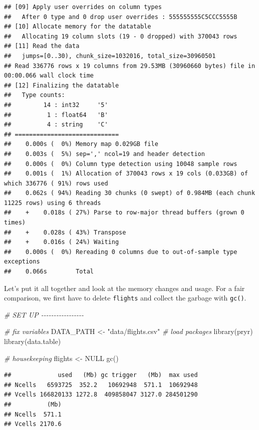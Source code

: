 \documentclass[
  12pt,
]{style/krantz}
\newenvironment{Shaded}{\begin{snugshade}}{\end{snugshade}}
\newcommand{\CommentTok}[1]{\textcolor[rgb]{0.56,0.35,0.01}{\textit{#1}}}
\newcommand{\ConstantTok}[1]{\textcolor[rgb]{0.00,0.00,0.00}{#1}}
\newcommand{\FunctionTok}[1]{\textcolor[rgb]{0.00,0.00,0.00}{#1}}
\newcommand{\NormalTok}[1]{#1}
\newcommand{\OtherTok}[1]{\textcolor[rgb]{0.56,0.35,0.01}{#1}}
\newcommand{\StringTok}[1]{\textcolor[rgb]{0.31,0.60,0.02}{#1}}
\begin{document}
\begin{verbatim}
## [09] Apply user overrides on column types
##   After 0 type and 0 drop user overrides : 555555555C5CCC5555B
## [10] Allocate memory for the datatable
##   Allocating 19 column slots (19 - 0 dropped) with 370043 rows
## [11] Read the data
##   jumps=[0..30), chunk_size=1032016, total_size=30960501
## Read 336776 rows x 19 columns from 29.53MB (30960660 bytes) file in 00:00.066 wall clock time
## [12] Finalizing the datatable
##   Type counts:
##         14 : int32     '5'
##          1 : float64   'B'
##          4 : string    'C'
## =============================
##    0.000s (  0%) Memory map 0.029GB file
##    0.003s (  5%) sep=',' ncol=19 and header detection
##    0.000s (  0%) Column type detection using 10048 sample rows
##    0.001s (  1%) Allocation of 370043 rows x 19 cols (0.033GB) of which 336776 ( 91%) rows used
##    0.062s ( 94%) Reading 30 chunks (0 swept) of 0.984MB (each chunk 11225 rows) using 6 threads
##    +    0.018s ( 27%) Parse to row-major thread buffers (grown 0 times)
##    +    0.028s ( 43%) Transpose
##    +    0.016s ( 24%) Waiting
##    0.000s (  0%) Rereading 0 columns due to out-of-sample type exceptions
##    0.066s        Total
\end{verbatim}

Let's put it all together and look at the memory changes and usage. For a fair comparison, we first have to delete \texttt{flights} and collect the garbage with \texttt{gc()}.

\begin{Shaded}
\begin{Highlighting}[]
\CommentTok{\# SET UP {-}{-}{-}{-}{-}{-}{-}{-}{-}{-}{-}{-}{-}{-}{-}{-}{-}}

\CommentTok{\# fix variables}
\NormalTok{DATA\_PATH }\OtherTok{\textless{}{-}} \StringTok{"data/flights.csv"}
\CommentTok{\# load packages}
\FunctionTok{library}\NormalTok{(pryr) }
\FunctionTok{library}\NormalTok{(data.table)}

\CommentTok{\# housekeeping}
\NormalTok{flights }\OtherTok{\textless{}{-}} \ConstantTok{NULL}
\FunctionTok{gc}\NormalTok{()}
\end{Highlighting}
\end{Shaded}

\begin{verbatim}
##             used   (Mb) gc trigger   (Mb)  max used
## Ncells   6593725  352.2   10692948  571.1  10692948
## Vcells 166820133 1272.8  409858047 3127.0 284501290
##          (Mb)
## Ncells  571.1
## Vcells 2170.6
\end{verbatim}
\end{document}
